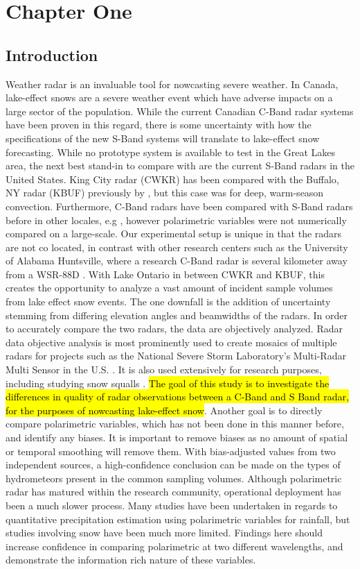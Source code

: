 \chapter{Chapter One}
\section{Introduction}
Weather radar is an invaluable tool for nowcasting severe weather. In Canada, lake-effect snows are a
severe weather event which have adverse impacts on a large
sector of the population. While the current Canadian C-Band radar systems have been proven in this
regard, there is some uncertainty with how the specifications of the new S-Band systems will translate to lake-effect snow forecasting. While no prototype
system is available to test in the Great Lakes area, the next best stand-in to compare with are the current
S-Band
radars in the United States. King City radar (CWKR) has been compared with the Buffalo, NY radar (KBUF)
previously by \cite{Boodoo2015}, but this case was for deep, warm-season convection. Furthermore, C-Band radars have been compared with S-Band radars before
in other locales, e.g \citep{Abon2014,
WMO2008}, however polarimetric variables were not numerically compared on a large-scale. Our experimental setup is unique in that the radars are not co
located, in contrast with other research centers such as the University of Alabama
Huntsville, where a research C-Band radar is several kilometer away from a WSR-88D
\citep{Petersen2007}. With Lake Ontario in between CWKR and KBUF, this creates the opportunity to analyze a vast amount of incident sample volumes from lake
effect snow events. The one downfall is the addition of uncertainty stemming from differing elevation angles and beamwidths of the radars. In order to
accurately compare the two
radars, the data are objectively analyzed. Radar data objective analysis is most prominently used to
create mosaics of multiple radars for projects such as the National Severe Storm Laboratory's Multi-Radar Multi
Sensor in the U.S. \citep{Zhang2016}. It is also used extensively for research purposes, including studying
snow squalls \citep{Mulholland2017}. \hl{The goal of this study is to investigate the differences in quality of radar observations between a C-Band and S
Band radar, for the purposes of
nowcasting lake-effect snow}. Another goal is to directly compare polarimetric variables,
which has not been done in this manner before, and
identify any biases. It is important to remove biases as no amount of spatial or temporal smoothing will
remove them. With bias-adjusted values from two independent sources, a high-confidence conclusion can
be made on the types of hydrometeors present in the common sampling volumes. Although polarimetric radar has matured within the research community, operational deployment has been a much
slower process. Many studies have been undertaken in regards to quantitative precipitation estimation
using polarimetric variables for rainfall, but studies involving snow have been much more limited. Findings here
should increase confidence in comparing polarimetric at two different wavelengths, and demonstrate
the information rich nature of these variables. 
